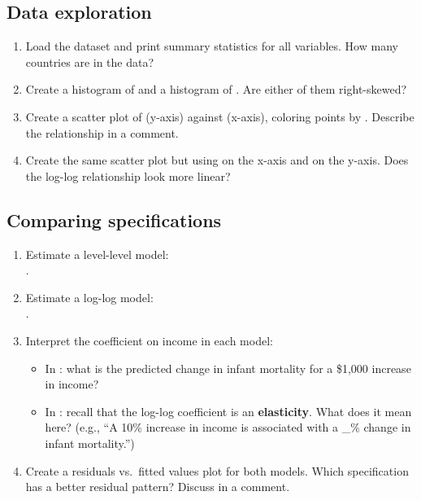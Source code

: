 \subsection{Data exploration}

\begin{enumerate}[label=\alph*)]
  \item Load the dataset and print summary statistics for all variables. How many countries are in the data?
  \item Create a histogram of  and a histogram of . Are either of them right-skewed?
  \item Create a scatter plot of  (y-axis) against  (x-axis), coloring points by . Describe the relationship in a comment.
  \item Create the same scatter plot but using  on the x-axis and  on the y-axis. Does the log-log relationship look more linear?
\end{enumerate}

\subsection{Comparing specifications}

\begin{enumerate}[label=\alph*)]
  \item Estimate a level-level model: \\.
  \item Estimate a log-log model: \\.
  \item Interpret the coefficient on income in each model:
  \begin{itemize}
    \item In : what is the predicted change in infant mortality for a \$1,000 increase in income?
    \item In : recall that the log-log coefficient is an \textbf{elasticity}. What does it mean here? (e.g., ``A 10\% increase in income is associated with a \_\% change in infant mortality.'')
  \end{itemize}
  \item Create a residuals vs.\ fitted values plot for both models. Which specification has a better residual pattern? Discuss in a comment.
\end{enumerate}

